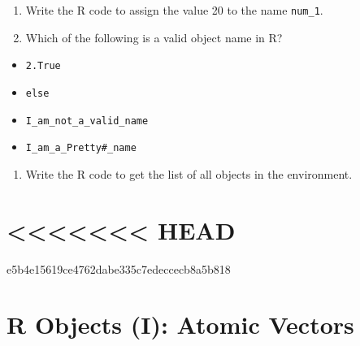 \documentclass[
]{book}
\providecommand{\tightlist}{%
  \setlength{\itemsep}{0pt}\setlength{\parskip}{0pt}}
\renewenvironment{quote}{\begin{VF}}{\end{VF}}
\begin{document}
\begin{enumerate}
\def\labelenumi{\arabic{enumi}.}
\item
  Write the R code to assign the value 20 to the name \texttt{num\_1}.
\item
  Which of the following is a valid object name in R?
\end{enumerate}

\begin{itemize}
\tightlist
\item
  \texttt{2.True}
\item
  \texttt{else}
\item
  \texttt{I\_am\_not\_a\_valid\_name}
\item
  \texttt{I\_am\_a\_Pretty\#\_name}
\end{itemize}

\begin{enumerate}
\def\labelenumi{\arabic{enumi}.}
\setcounter{enumi}{2}
\tightlist
\item
  Write the R code to get the list of all objects in the environment.
\end{enumerate}

\hypertarget{head}{%
\chapter{\textless\textless\textless\textless\textless\textless\textless{} HEAD}\label{head}}

\begin{quote}
\begin{quote}
\begin{quote}
\begin{quote}
\begin{quote}
\begin{quote}
\begin{quote}
e5b4e15619ce4762dabe335c7edeccecb8a5b818
\end{quote}
\end{quote}
\end{quote}
\end{quote}
\end{quote}
\end{quote}
\end{quote}

\hypertarget{r-objects}{%
\chapter{R Objects (I): Atomic Vectors}\label{r-objects}}
\end{document}
